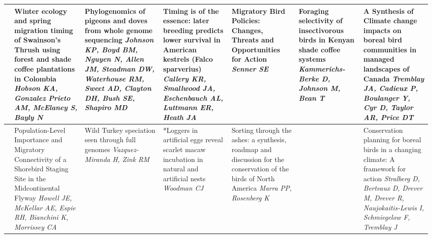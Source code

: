 \begin{tabular}{|x{0.75cm}|x{2.25cm}|x{2.25cm}|x{2.25cm}|a{2.25cm}|a{2.25cm}|a{2.25cm}|}
\hline
{}&Winter ecology and spring migration timing of Swainson’s Thrush using forest and shade coffee plantations in Colombia \newline \newline \textit{Hobson KA, Gonzalez Prieto AM, McElaney S, Bayly N} & Phylogenomics of pigeons and doves from whole genome sequencing \newline \newline \textit{Johnson KP, Boyd BM, Nguyen N, Allen JM, Steadman DW, Waterhouse RM, Sweet AD, Clayton DH, Bush SE, Shapiro MD} & Timing is of the essence: later breeding predicts lower survival in American kestrels (Falco sparverius) \newline \newline \textit{Callery KR, Smallwood JA, Eschenbauch AL, Luttmann ER, Heath JA} & Migratory Bird Policies: Changes, Threats and Opportunities for Action \newline \newline \textit{Senner SE} & Foraging selectivity of insectivorous birds in Kenyan shade coffee systems \newline \newline \textit{Kammerichs-Berke D, Johnson M, Bean T} & A Synthesis of Climate change impacts on boreal bird communities in managed landscapes of Canada \newline \newline \textit{Tremblay JA, Cadieux P, Boulanger Y, Cyr D, Taylor AR, Price DT}\\
\hline
{}&Population-Level Importance and Migratory Connectivity of a Shorebird Staging Site in the Midcontinental Flyway \newline \newline \textit{Howell JE, McKellar AE, Espie RH, Bianchini K, Morrissey CA} & Wild Turkey speciation seen through full genomes \newline \newline \textit{Vazquez-Miranda H, Zink RM} & *Loggers in artificial eggs reveal scarlet macaw incubation in natural and artificial nests \newline \newline \textit{Woodman CJ} & Sorting through the ashes: a synthesis, roadmap and discussion for the conservation of the birds of North America \newline \newline \textit{Marra PP, Rosenberg K} &  \newline \newline \textit{} & Conservation planning for boreal birds in a changing climate: A framework for action \newline \newline \textit{Stralberg D, Berteaux D, Drever M, Drever R, Naujokaitis-Lewis I, Schmiegelow F, Tremblay J}\\

\end{tabular}
